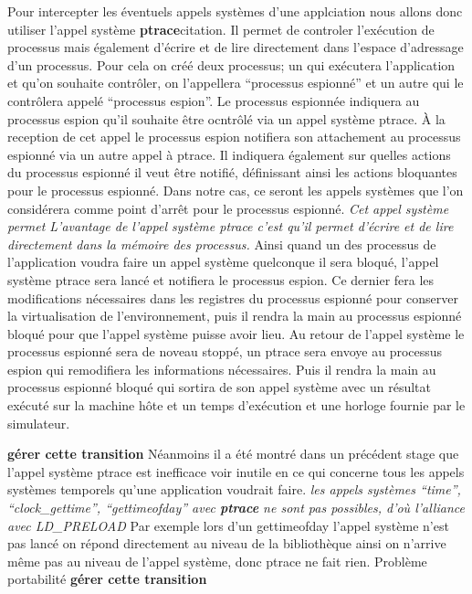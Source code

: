 Pour intercepter les éventuels appels systèmes d'une applciation nous allons
donc utiliser l'appel système \textbf{ptrace}{\color{red}citation}. Il permet de
controler l'exécution de processus mais également d'écrire et de lire
directement dans l'espace d'adressage d'un processus. Pour cela on créé deux
processus; un qui exécutera l'application et qu'on souhaite contrôler, on
l'appellera ``processus espionné'' et un autre qui le contrôlera appelé
``processus espion''. Le processus espionnée indiquera au processus espion qu'il
souhaite être ocntrôlé via un appel système ptrace. À la reception de cet appel
le processus espion notifiera son attachement au processus espionné via un autre
appel à ptrace. Il indiquera également sur quelles actions du processus espionné
il veut être notifié, définissant ainsi les actions bloquantes pour le processus
espionné. Dans notre cas, ce seront les appels systèmes que l'on considérera
comme point d'arrêt pour le processus espionné. \textit{Cet appel système permet
  L'avantage de l'appel système ptrace c'est qu'il permet d'écrire et de lire
  directement dans la mémoire des processus.} Ainsi quand un des processus de
l'application voudra faire un appel système quelconque il sera bloqué, l'appel
système ptrace sera lancé et notifiera le processus espion. Ce dernier fera les
modifications nécessaires dans les registres du processus espionné pour
conserver la virtualisation de l'environnement, puis il rendra la main au
processus espionné bloqué pour que l'appel système puisse avoir lieu. Au retour
de l'appel système le processus espionné sera de noveau stoppé, un ptrace sera
envoye au processus espion qui remodifiera les informations nécessaires. Puis il
rendra la main au processus espionné bloqué qui sortira de son appel système
avec un résultat exécuté sur la machine hôte et un temps d'exécution et une
horloge fournie par le simulateur.

{\color{red} \textbf{gérer cette transition}} Néanmoins il a été montré dans un
précédent stage que l'appel système ptrace est inefficace voir inutile en ce qui
concerne tous les appels systèmes temporels qu'une application voudrait
faire. \textit{les appels systèmes ``time'', ``clock\_gettime'',
  ``gettimeofday'' avec \textbf{ptrace} ne sont pas possibles, d'où l'alliance
  avec LD\_PRELOAD} Par exemple lors d'un gettimeofday l'appel système n'est pas
lancé on répond directement au niveau de la bibliothèque ainsi on n'arrive même
pas au niveau de l'appel système, donc ptrace ne fait rien.  Problème
portabilité {\color{red} \textbf{gérer cette transition}}

